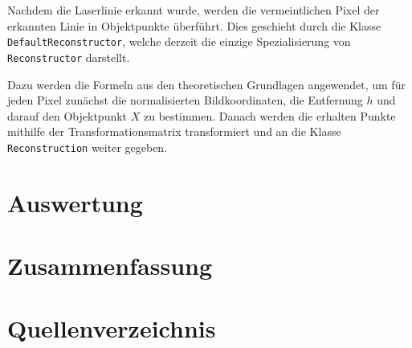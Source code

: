 \documentclass[ngerman,a4paper,parskip=half]{scrartcl}
\begin{document}
Nachdem die Laserlinie erkannt wurde, werden die vermeintlichen Pixel der erkannten Linie in Objektpunkte überführt. Dies geschieht durch die Klasse \texttt{DefaultReconstructor}, welche derzeit die einzige Spezialisierung von \texttt{Reconstructor} darstellt.

Dazu werden die Formeln aus den theoretischen Grundlagen angewendet, um für jeden Pixel zunächst die normalisierten Bildkoordinaten, die Entfernung $h$ und darauf den Objektpunkt $X$ zu bestimmen. Danach werden die erhalten Punkte mithilfe der Transformationsmatrix transformiert und an die Klasse \texttt{Reconstruction} weiter gegeben.


\section{Auswertung}


\section{Zusammenfassung}


\section{Quellenverzeichnis}

\end{document}
